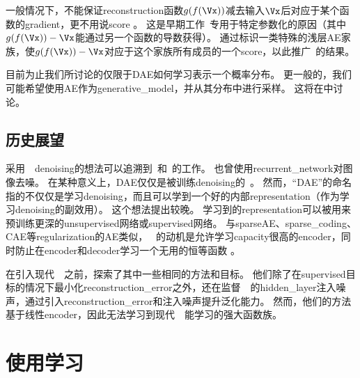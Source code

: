 一般情况下，不能保证\gls{reconstruction}函数$g(f(\Vx))$减去输入$\Vx$后对应于某个函数的\gls{gradient}，更不用说\gls{score} 。
这是早期工作~\citep{Vincent-NC-2011-small}专用于特定参数化的原因（其中$g(f(\Vx)) - \Vx$能通过另一个函数的导数获得）。
\citet{Kamyshanska+Memisevic-2015}通过标识一类特殊的浅层\gls{AE}家族，使$g(f(\Vx)) - \Vx$对应于这个家族所有成员的一个\gls{score}，以此推广~\citet{Vincent-NC-2011-small}的结果。


目前为止我们所讨论的仅限于\gls{DAE}如何学习表示一个概率分布。
更一般的，我们可能希望使用\gls{AE}作为\gls{generative_model}，并从其分布中进行采样。
这将在中讨论。


\subsection{历史展望}
\label{sec:historical_perspective_chap14}
采用~~\gls{denoising}的想法可以追溯到~\cite{Lecun-these87}和~\citet{Gallinari87}的工作。
\citet{Behnke-2001}也曾使用\gls{recurrent_network}对图像去噪。
在某种意义上，\gls{DAE}仅仅是被训练\gls{denoising}的~。
然而，``\gls{DAE}''的命名指的不仅仅是学习\gls{denoising}，而且可以学到一个好的内部\gls{representation}（作为学习\gls{denoising}的副效用）。
这个想法提出较晚\citep{VincentPLarochelleH2008-small,Vincent-JMLR-2010-small}。
学习到的\gls{representation}可以被用来预训练更深的\gls{unsupervised}网络或\gls{supervised}网络。
与\gls{sparse}\gls{AE}、\gls{sparse_coding}、\gls{CAE}等\gls{regularization}的\gls{AE}类似， ~的动机是允许学习\gls{capacity}很高的\gls{encoder}，同时防止在\gls{encoder}和\gls{decoder}学习一个无用的恒等函数 。


在引入现代~~之前，\citet{Inayoshi-and-Kurita-2005}探索了其中一些相同的方法和目标。
他们除了在\gls{supervised}目标的情况下最小化\gls{reconstruction_error}之外，还在监督~~的\gls{hidden_layer}注入噪声，通过引入\gls{reconstruction_error}和注入噪声提升泛化能力。
然而，他们的方法基于线性\gls{encoder}，因此无法学习到现代~~能学习的强大函数族。



\section{使用学习}
\label{sec:learning_manifolds_with_autoencoders}

